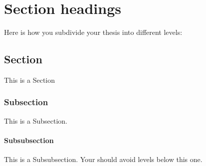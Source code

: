 \chapter{Section headings}
Here is how you subdivide your thesis into different levels:

\section{Section}
This is a Section

\subsection{Subsection}
This is a Subsection.

\subsubsection{Subsubsection}
This is a Subsubsection. Your should avoid levels below this one.
